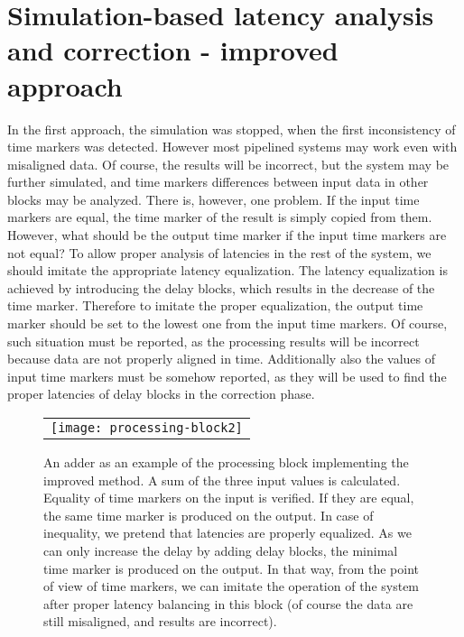 \documentclass[preprint,11pt]{elsarticle}
\begin{document}
\section{Simulation-based latency analysis and correction - improved approach}
In the first approach, the simulation was stopped, when the first inconsistency of time markers was detected.
However most pipelined systems may work even with misaligned data.
Of course, the results will be incorrect, but the system may be further simulated, and time markers differences between input data in other blocks may be analyzed.
There is, however, one problem. If the input time markers are equal, the time marker
of the result is simply copied from them. However, what should be the output time marker if the input time markers are not equal?
To allow proper analysis of latencies in the rest of the system, we should imitate the appropriate latency equalization. The latency equalization is achieved by introducing the delay
blocks, which results in the decrease of the time marker.
Therefore to imitate the proper equalization, the output time marker should be set to the
lowest one from the input time markers.
Of course, such situation must be reported, as the processing results will be incorrect because 
data are not properly aligned in time.
Additionally also the values of input time markers must be somehow reported, as they will be used to find the proper latencies of delay blocks in the correction phase.
	
\begin{figure}[t]
 {   
 \begin{center}
   \begin{tabular}{c}
    \texttt{[image: processing-block2]}
   \end{tabular}
 \end{center}
 \caption
 { \label{fig:adder-block2}
   An adder as an example of the processing block implementing the improved method.
   A sum of the three input values is calculated. Equality of time markers on the input
   is verified. If they are equal, the same time marker is produced on the output.
   In case of inequality, we pretend that latencies are properly equalized. As we can only increase the delay by adding delay blocks, the minimal time marker is produced on the output.
   In that way, from the point of view of time markers, we can imitate the operation of the system after proper latency balancing in this block (of course the data are still misaligned, and results are incorrect).
   }
 }
\end{figure}
	
\end{document}
